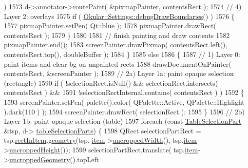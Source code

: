 \begin{DoxyCode}
       )
1573                     d->\hyperlink{classPageViewPrivate_a07bad73b61f6b400411aacc7e2e820a0}{annotator}->\hyperlink{classPageViewAnnotator_a5d6faca78c8b002a1b2c30cb8570e47f}{routePaint}( &pixmapPainter, contentsRect );
1574                 \textcolor{comment}{// 4) Layer 2: overlays}
1575                 \textcolor{keywordflow}{if} ( \hyperlink{classOkular_1_1Settings_a21cc1aa57a32a43b985d916fa0f2b7ae}{Okular::Settings::debugDrawBoundaries}() )
1576                 \{
1577                     pixmapPainter.setPen( Qt::blue );
1578                     pixmapPainter.drawRect( contentsRect );
1579                 \}
1580 
1581                 \textcolor{comment}{// finish painting and draw contents}
1582                 pixmapPainter.end();
1583                 screenPainter.drawPixmap( contentsRect.left(), contentsRect.top(), doubleBuffer );
1584             \}
1585             \textcolor{keywordflow}{else}
1586             \{
1587                 \textcolor{comment}{// 1) Layer 0: paint items and clear bg on unpainted rects}
1588                 drawDocumentOnPainter( contentsRect, &screenPainter );
1589                 \textcolor{comment}{// 2a) Layer 1a: paint opaque selection (rectangle)}
1590                 \textcolor{keywordflow}{if} ( !selectionRect.isNull() && selectionRect.intersects( contentsRect ) &&
1591                     !selectionRectInternal.contains( contentsRect ) )
1592                 \{
1593                     screenPainter.setPen( palette().color( QPalette::Active, QPalette::Highlight ).dark(110
      ) );
1594                     screenPainter.drawRect( selectionRect );
1595                 \}
1596                 \textcolor{comment}{// 2b) Layer 1b: paint opaque selection (table)}
1597                 \textcolor{keywordflow}{foreach} (\textcolor{keyword}{const} \hyperlink{structTableSelectionPart}{TableSelectionPart} &tsp, d->
      \hyperlink{classPageViewPrivate_aec476c0b74867740803d4ba34393b154}{tableSelectionParts}) \{
1598                     QRect selectionPartRect = tsp.\hyperlink{structTableSelectionPart_ade01925b1444763cb413ad51ae7729a7}{rectInItem}.\hyperlink{classOkular_1_1NormalizedRect_a006897c5fcff2c3a97b4141f1a967513}{geometry}(tsp.
      \hyperlink{structTableSelectionPart_a400edc4e1ec30e28ff8159a741776e4b}{item}->\hyperlink{classPageViewItem_a240924407ae22bb0489363a6a2d481b9}{uncroppedWidth}(), tsp.\hyperlink{structTableSelectionPart_a400edc4e1ec30e28ff8159a741776e4b}{item}->\hyperlink{classPageViewItem_af1380fce5dc13a72458ef834c720b128}{uncroppedHeight}());
1599                     selectionPartRect.translate( tsp.\hyperlink{structTableSelectionPart_a400edc4e1ec30e28ff8159a741776e4b}{item}->\hyperlink{classPageViewItem_a5d2e73a003f65b4e95c0c21b1698f835}{uncroppedGeometry}().topLeft

\end{DoxyCode}
